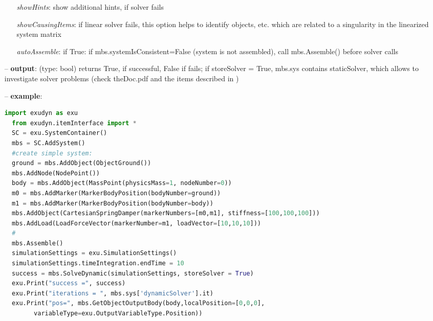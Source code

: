 \begin{itemize}[leftmargin=0.7cm]
\begin{itemize}[leftmargin=1.2cm]
\item[]{\it showHints}: show additional hints, if solver fails
\item[]{\it showCausingItems}: if linear solver fails, this option helps to identify objects, etc. which are related to a singularity in the linearized system matrix
\item[]{\it autoAssemble}: if True: if mbs.systemIsConsistent=False (system is not assembled), call mbs.Assemble() before solver calls
\end{itemize}
\item[--]
{\bf output}: (type: bool) returns True, if successful, False if fails; if storeSolver = True, mbs.sys contains staticSolver, which allows to investigate solver problems (check theDoc.pdf  and the items described in )
\item[--]
{\bf example}: \vspace{-12pt}\ei\begin{lstlisting}[language=Python, xleftmargin=36pt]
  import exudyn as exu
  from exudyn.itemInterface import *
  SC = exu.SystemContainer()
  mbs = SC.AddSystem()
  #create simple system:
  ground = mbs.AddObject(ObjectGround())
  mbs.AddNode(NodePoint())
  body = mbs.AddObject(MassPoint(physicsMass=1, nodeNumber=0))
  m0 = mbs.AddMarker(MarkerBodyPosition(bodyNumber=ground))
  m1 = mbs.AddMarker(MarkerBodyPosition(bodyNumber=body))
  mbs.AddObject(CartesianSpringDamper(markerNumbers=[m0,m1], stiffness=[100,100,100]))
  mbs.AddLoad(LoadForceVector(markerNumber=m1, loadVector=[10,10,10]))
  #
  mbs.Assemble()
  simulationSettings = exu.SimulationSettings()
  simulationSettings.timeIntegration.endTime = 10
  success = mbs.SolveDynamic(simulationSettings, storeSolver = True)
  exu.Print("success =", success)
  exu.Print("iterations = ", mbs.sys['dynamicSolver'].it)
  exu.Print("pos=", mbs.GetObjectOutputBody(body,localPosition=[0,0,0],
        variableType=exu.OutputVariableType.Position))
\end{lstlisting}\vspace{-24pt}\bi\item[]\vspace{-24pt}\vspace{12pt}\end{itemize}
%

